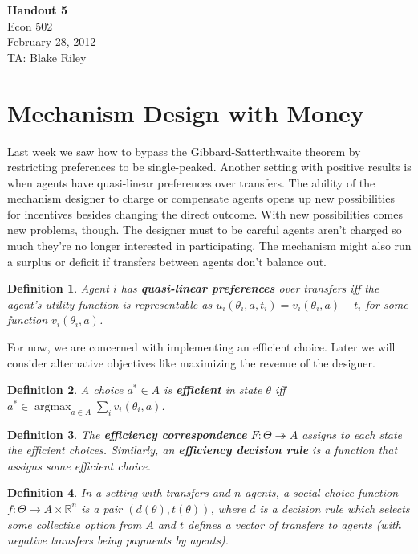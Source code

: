 \documentclass[letter, 10pt]{article}
\theoremstyle{basic}
\newtheorem{definition}{Definition}[section]
\newcommand{\R}{\mathbb{R}}
\newcommand{\tto}{\twoheadrightarrow}
\begin{document}
\begin{spacing}{1.0}

\noindent
\textbf{Handout 5} \\
Econ 502 \\
February 28, 2012 \\
TA: Blake Riley \\

\section{Mechanism Design with Money}
\label{sec:vick-clarke-grov}

Last week we saw how to bypass the Gibbard-Satterthwaite theorem by
restricting preferences to be single-peaked. Another setting with positive
results is when agents have quasi-linear preferences over transfers. The
ability of the mechanism designer to charge or compensate agents opens up
new possibilities for incentives besides changing the direct outcome. With
new possibilities comes new problems, though. The designer must to be
careful agents aren't charged so much they're no longer interested in
participating. The mechanism might also run a surplus or deficit if
transfers between agents don't balance out.

\begin{definition}
  Agent $i$ has \textbf{quasi-linear preferences} over transfers iff the
  agent's utility function is representable as $u_i(\theta_i, a, t_i) =
  v_i(\theta_i,a)+t_i$ for some function $v_i(\theta_i,a)$.
\end{definition}

For now, we are concerned with implementing an efficient choice. Later we
will consider alternative objectives like maximizing the revenue of the
designer.

\begin{definition}
  A choice $a^* \in A$ is \textbf{efficient} in state $\theta$ iff $a^* \in
  \operatorname{argmax}_{a\in A} \sum_i v_i(\theta_i, a)$.
\end{definition}

\begin{definition}
  The \textbf{efficiency correspondence} $\bar{F}:\Theta \tto A$ assigns to
  each state the efficient choices. Similarly, an \textbf{efficiency
    decision rule} is a function that assigns some efficient choice.
\end{definition}

\begin{definition}
  In a setting with transfers and $n$ agents, a social choice function
  $f:\Theta \to A\times \R^n$ is a pair $(d(\theta), t(\theta))$, where $d$
  is a decision rule which selects some collective option from $A$ and $t$
  defines a vector of transfers to agents (with negative transfers being
  payments by agents).
\end{definition}


\end{spacing}
\end{document}
